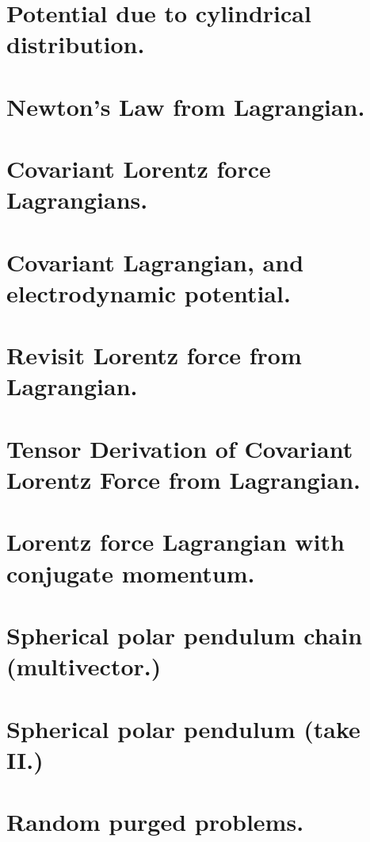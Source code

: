 \chapter{Potential due to cylindrical distribution.}
   
\chapter{Newton's Law from Lagrangian.}
\chapter{Covariant Lorentz force Lagrangians.}
   
\chapter{Covariant Lagrangian, and electrodynamic potential.}
\chapter{Revisit Lorentz force from Lagrangian.}
\chapter{Tensor Derivation of Covariant Lorentz Force from Lagrangian.}
\chapter{Lorentz force Lagrangian with conjugate momentum.}
\chapter{Spherical polar pendulum chain (multivector.)}
   
\chapter{Spherical polar pendulum (take II.)}
   
\chapter{Random purged problems.}
   

\EndNoBibArticle
